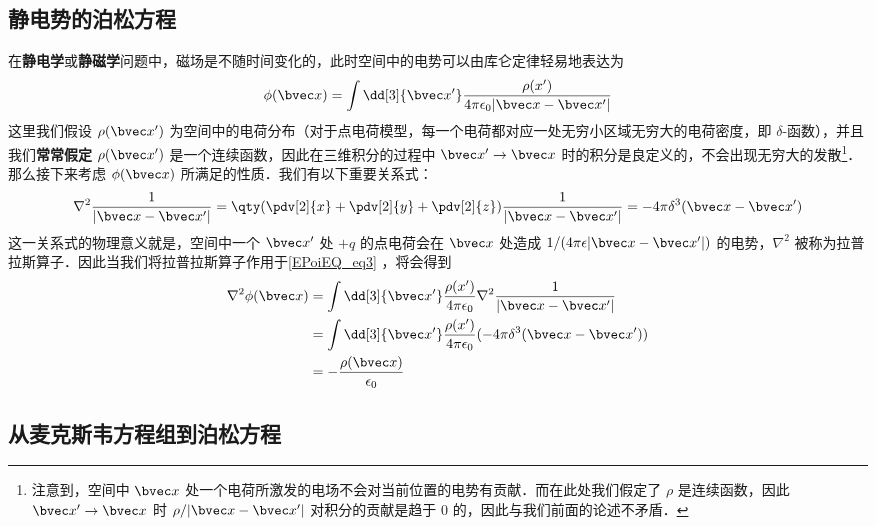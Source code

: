 

\subsection{静电势的泊松方程}
在\textbf{静电学}或\textbf{静磁学}问题中，磁场是不随时间变化的，此时空间中的电势可以由库仑定律轻易地表达为
\begin{equation}\label{EPoiEQ_eq3}
\phi(\bvec x) = \int \dd[3]{\bvec x'} \frac{\rho(x')}{4\pi \epsilon_0|\bvec x-\bvec x'|}
\end{equation}
这里我们假设 $\rho(\bvec x')$ 为空间中的电荷分布（对于点电荷模型，每一个电荷都对应一处无穷小区域无穷大的电荷密度，即 $\delta$-函数），并且我们\textbf{常常假定} $\rho(\bvec x')$ 是一个连续函数，因此在三维积分的过程中 $\bvec x'\rightarrow \bvec x$ 时的积分是良定义的，不会出现无穷大的发散\footnote{注意到，空间中 $\bvec x$ 处一个电荷所激发的电场不会对当前位置的电势有贡献．而在此处我们假定了 $\rho$ 是连续函数，因此 $\bvec x'\rightarrow \bvec x$ 时 $\rho/|\bvec x-\bvec x'|$ 对积分的贡献是趋于 $0$ 的，因此与我们前面的论述不矛盾．}．那么接下来考虑 $\phi(\bvec x)$ 所满足的性质．我们有以下重要关系式：
\begin{equation}
\nabla^2 \frac{1}{|\bvec x-\bvec x'|} = \qty(\pdv[2]{x}+\pdv[2]{y}+\pdv[2]{z}) \frac{1}{|\bvec x-\bvec x'|}= -4\pi\delta^3(\bvec x-\bvec x')
\end{equation}
这一关系式的物理意义就是，空间中一个 $\bvec x'$ 处 $+q$ 的点电荷会在 $\bvec x$ 处造成 $1/(4\pi\epsilon |\bvec x-\bvec x'|)$ 的电势，$\nabla^2$ 被称为拉普拉斯算子．因此当我们将拉普拉斯算子作用于\autoref{EPoiEQ_eq3} ，将会得到
\begin{equation}
\begin{aligned}
\nabla^2\phi(\bvec x) &= \int \dd[3]{\bvec x'}\frac{\rho(x')}{4\pi \epsilon_0} \nabla^2 \frac{1}{|\bvec x-\bvec x'|} \\
&= \int \dd[3]{\bvec x'}\frac{\rho(x')}{4\pi \epsilon_0} ( -4\pi\delta^3(\bvec x-\bvec x'))\\
&= -\frac{\rho(\bvec x)}{\epsilon_0}
\end{aligned}
\end{equation}

\subsection{从麦克斯韦方程组到泊松方程}
